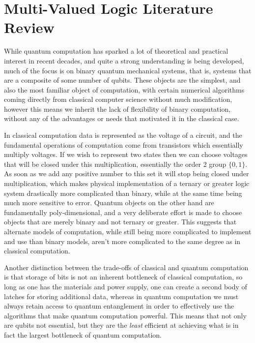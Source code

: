 
\chapter[MULTI VALUED LOGIC LITERATURE REVIEW]{Multi-Valued Logic Literature Review}
While quantum computation has sparked a lot of theoretical and practical interest in recent decades, and quite a strong understanding is being developed, much of the focus is on binary quantum mechanical systems, that is, systems that are a composite of some number of qubits. These objects are the simplest, and also the most familiar object of computation, with certain numerical algorithms coming directly from classical computer science without much modification, however this means we inherit the lack of flexibility of binary computation, without any of the advantages or needs that motivated it in the classical case.

In classical computation data is represented as the voltage of a circuit, and the fundamental operations of computation come from transistors which essentially multiply voltages. If we wish to represent two states then we can choose voltages that will be closed under this multiplication, essentially the order 2 group $\{0, 1\}$. As soon as we add any positive number to this set it will stop being closed under multiplication, which makes physical implementation of a ternary or greater logic system drastically more complicated than binary, while at the same time being much more sensitive to error. Quantum objects on the other hand are fundamentally poly-dimensional, and a very deliberate effort is made to choose objects that are merely binary and not ternary or greater. This suggests that alternate models of computation, while still being more complicated to implement and use than binary models, aren't more complicated to the same degree as in classical computation.

Another distinction between the trade-offs of classical and quantum computation is that storage of bits is not an inherent bottleneck of classical computation, so long as one has the materials and power supply, one can create a second body of latches for storing additional data, whereas in quantum computation we must always retain access to quantum entanglement in order to effectively use the algorithms that make quantum computation powerful. This means that not only are qubits not essential, but they are the \textit{least} efficient at achieving what is in fact the largest bottleneck of quantum computation.

